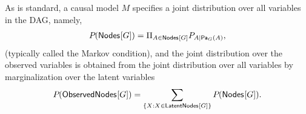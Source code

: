 
As is standard, a causal model $M$ specifies a joint distribution over all variables in the DAG, namely,
\begin{align}
\pdf{\SmallNamedFunction{Nodes}{G}} = \Pi_{A\in \SmallNamedFunction{Nodes}{G}} \pfunc{A|\Pa[G]{A}},
\end{align}
(typically called the Markov condition), 
and the joint distribution over the observed variables is obtained from the joint distribution over all variables by marginalization over the latent variables 
\begin{align}
\pdf{\SmallNamedFunction{ObservedNodes}{G}} =  \sum_{\{X :X \in\SmallNamedFunction{LatentNodes}{G}\}} \pdf{\SmallNamedFunction{Nodes}{G}}.
\end{align}

